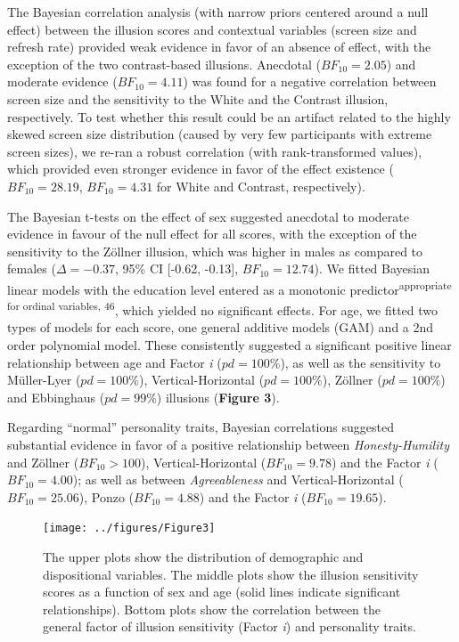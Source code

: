 \documentclass[
  man,floatsintext]{apa6}
\begin{document}
The Bayesian correlation analysis (with narrow priors centered around a null effect) between the illusion scores and contextual variables (screen size and refresh rate) provided weak evidence in favor of an absence of effect, with the exception of the two contrast-based illusions. Anecdotal (\(BF_{10} = 2.05\)) and moderate evidence (\(BF_{10} = 4.11\)) was found for a negative correlation between screen size and the sensitivity to the White and the Contrast illusion, respectively. To test whether this result could be an artifact related to the highly skewed screen size distribution (caused by very few participants with extreme screen sizes), we re-ran a robust correlation (with rank-transformed values), which provided even stronger evidence in favor of the effect existence (\(BF_{10} = 28.19\), \(BF_{10} = 4.31\) for White and Contrast, respectively).

The Bayesian t-tests on the effect of sex suggested anecdotal to moderate evidence in favour of the null effect for all scores, with the exception of the sensitivity to the Zöllner illusion, which was higher in males as compared to females (\(\Delta=-0.37\), 95\% CI {[}-0.62, -0.13{]}, \(BF_{10} = 12.74\)). We fitted Bayesian linear models with the education level entered as a monotonic predictor\textsuperscript{appropriate for ordinal variables, 46}, which yielded no significant effects. For age, we fitted two types of models for each score, one general additive models (GAM) and a 2nd order polynomial model. These consistently suggested a significant positive linear relationship between age and Factor \emph{i} (\(pd=100\%\)), as well as the sensitivity to Müller-Lyer (\(pd=100\%\)), Vertical-Horizontal (\(pd=100\%\)), Zöllner (\(pd=100\%\)) and Ebbinghaus (\(pd=99\%\)) illusions (\textbf{Figure 3}).

Regarding ``normal'' personality traits, Bayesian correlations suggested substantial evidence in favor of a positive relationship between \emph{Honesty-Humility} and Zöllner (\(BF_{10} > 100\)), Vertical-Horizontal (\(BF_{10} = 9.78\)) and the Factor \emph{i} (\(BF_{10} = 4.00\)); as well as between \emph{Agreeableness} and Vertical-Horizontal (\(BF_{10} = 25.06\)), Ponzo (\(BF_{10} = 4.88\)) and the Factor \emph{i} (\(BF_{10} = 19.65\)).

\begin{figure}
\texttt{[image: ../figures/Figure3]} \caption{The upper plots show the distribution of demographic and dispositional variables. The middle plots show the illusion sensitivity scores as a function of sex and age (solid lines indicate significant relationships). Bottom plots show the correlation between the general factor of illusion sensitivity (Factor \textit{i}) and personality traits.}\label{fig:unnamed-chunk-4}
\end{figure}
\end{document}
